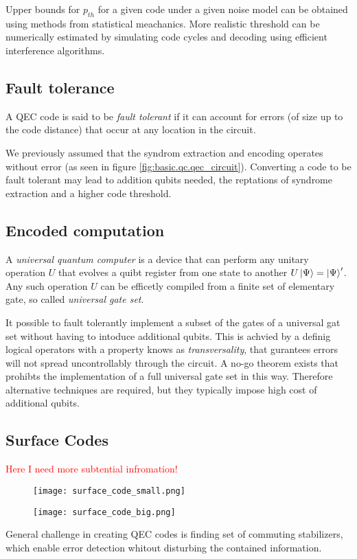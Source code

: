 Upper bounds for $p_{th}$ for a given code under a given noise model can be obtained using methods from statistical meachanics.
More realistic threshold can be numerically estimated by simulating code cycles and decoding using efficient interference algorithms. 

\subsection{Fault tolerance}

A QEC code is said to be \textit{fault tolerant} if it can account for errors (of size up to the code distance) that occur at any location in the circuit.

We previously assumed that the syndrom extraction and encoding operates without error (as seen in figure \ref{fig:basic.qc.qec_circuit}).
Converting a code to be fault tolerant may lead to addition qubits needed, the reptations of syndrome extraction and a higher code threshold. 


\subsection{Encoded computation}
A \textit{universal quantum computer} is a device that can perform any unitary operation $U$ that evolves a quibt register from one state to another $U\ket{\Psi} = \ket{\Psi}'$.
Any such operation $U$ can be efficetly compiled from a finite set of elementary gate, so called \textit{universal gate set}.

It possible to fault tolerantly implement a subset of the gates of a universal gat set without having to intoduce additional qubits. 
This is achvied by a definig logical operators with a property knows as \textit{transversality}, that gurantees errors will not spread uncontrollably through the circuit.
A no-go theorem exists that prohibts the implementation of a full universal gate set in this way. 
Therefore alternative techniques are required, but they typically impose high cost of additional qubits.




\subsection{Surface Codes}
\textcolor{red}{Here I need more subtential infromation!}
\begin{figure}[h]
    \begin{center}
        \texttt{[image: surface\_code\_small.png]}
    \end{center}
    \label{fig:basic.qc.surface_code_small}
\end{figure}
\begin{figure}[h]
    \begin{center}
        \texttt{[image: surface\_code\_big.png]}
    \end{center}
    \label{fig:basic.qc.surface_code_big}
\end{figure}
General challenge in creating QEC codes is finding set of commuting stabilizers, 
which enable error detection whitout disturbing the contained information.

